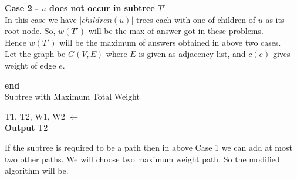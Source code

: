 \documentclass{report}
\begin{document}
 \textbf{Case 2 - $u$ does not occur in subtree $T'$}\\
 In this case we have $|children(u)|$ trees each with one of children of $u$ as its root node.
 So,  $w(T')$ will be the max of answer got in these problems.\\
 Hence $w(T')$ will be the maximum of answers obtained in above two cases.\\
 
 Let the graph be $G(V, E)$ where $E$ is given as adjacency list, and $c(e)$ gives weight of edge $e$. 
 
\begin{algorithm}[H]
 \SetAlgoLined
\textbf{end}\\
\caption{Subtree with Maximum Total Weight}
T1, T2, W1, W2 $\gets$ \\
\textbf{Output} T2
\end{algorithm}
\newpage
If the subtree is required to be a path then in above Case 1 we can add at most two other paths. We will choose two maximum weight path. So the modified algorithm will be.
\end{document}
